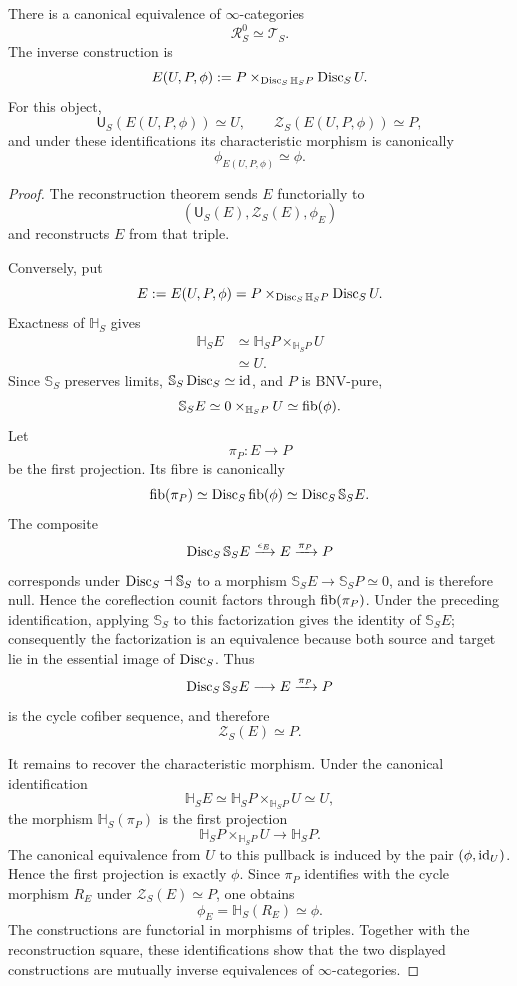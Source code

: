 \begin{theorem}
\label{thm:infinitesimal-bnv-classification}
There is a canonical equivalence of $\infty$-categories
\[
    \boxed{
    \mathcal R_S^0\simeq\mathcal T_S.
    }
\]
The inverse construction is
\[
    E(U,P,\phi)
    :=
    P
    \times_{\operatorname{Disc}_S\mathbb H_SP}
    \operatorname{Disc}_SU.
\]
For this object,
\[
    \mathsf U_S(E(U,P,\phi))\simeq U,
    \qquad
    \mathcal Z_S(E(U,P,\phi))\simeq P,
\]
and under these identifications its characteristic morphism is canonically
\[
    \phi_{E(U,P,\phi)}\simeq\phi.
\]
\end{theorem}

\begin{proof}
The reconstruction theorem sends $E$ functorially to
\[
    \left(
      \mathsf U_S(E),
      \mathcal Z_S(E),
      \phi_E
    \right)
\]
and reconstructs $E$ from that triple.

Conversely, put
\[
    E:=E(U,P,\phi)
    =P\times_{\operatorname{Disc}_S\mathbb H_SP}\operatorname{Disc}_SU.
\]
Exactness of $\mathbb H_S$ gives
\[
\begin{aligned}
    \mathbb H_SE
    &\simeq
    \mathbb H_SP\times_{\mathbb H_SP}U\\
    &\simeq U.
\end{aligned}
\]
Since $\mathbb S_S$ preserves limits, $\mathbb S_S\operatorname{Disc}_S\simeq\operatorname{id}$, and
$P$ is BNV-pure,
\[
    \mathbb S_SE
    \simeq
    0\times_{\mathbb H_SP}U
    \simeq
    \operatorname{fib}(\phi).
\]
Let
\[
    \pi_P:E\longrightarrow P
\]
be the first projection.  Its fibre is canonically
\[
    \operatorname{fib}(\pi_P)
    \simeq
    \operatorname{Disc}_S\operatorname{fib}(\phi)
    \simeq
    \operatorname{Disc}_S\mathbb S_SE.
\]
The composite
\[
    \operatorname{Disc}_S\mathbb S_SE
    \xrightarrow{\epsilon_E}
    E
    \xrightarrow{\pi_P}
    P
\]
corresponds under $\operatorname{Disc}_S\dashv\mathbb S_S$ to a morphism
$\mathbb S_SE\to\mathbb S_SP\simeq0$, and is therefore null.  Hence the
coreflection counit factors through $\operatorname{fib}(\pi_P)$.  Under the preceding
identification, applying $\mathbb S_S$ to this factorization gives the
identity of $\mathbb S_SE$; consequently the factorization is an equivalence
because both source and target lie in the essential image of $\operatorname{Disc}_S$.
Thus
\[
    \operatorname{Disc}_S\mathbb S_SE
    \longrightarrow
    E
    \xrightarrow{\pi_P}
    P
\]
is the cycle cofiber sequence, and therefore
\[
    \mathcal Z_S(E)\simeq P.
\]

It remains to recover the characteristic morphism.  Under the canonical
identification
\[
    \mathbb H_SE
    \simeq
    \mathbb H_SP\times_{\mathbb H_SP}U
    \simeq U,
\]
the morphism $\mathbb H_S(\pi_P)$ is the first projection
\[
    \mathbb H_SP\times_{\mathbb H_SP}U
    \longrightarrow
    \mathbb H_SP.
\]
The canonical equivalence from $U$ to this pullback is induced by the pair
$(\phi,\operatorname{id}_U)$.  Hence the first projection is exactly $\phi$.  Since
$\pi_P$ identifies with the cycle morphism $R_E$ under
$\mathcal Z_S(E)\simeq P$, one obtains
\[
    \phi_E=\mathbb H_S(R_E)\simeq\phi.
\]
The constructions are functorial in morphisms of triples.  Together with the
reconstruction square, these identifications show that the two displayed
constructions are mutually inverse equivalences of $\infty$-categories.
\end{proof}

